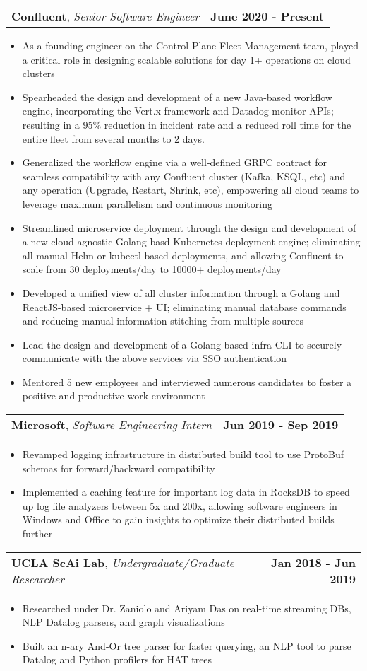 \documentclass[letterpaper,10.8pt]{article}
\makeatletter
\newcommand{\resumeItemOne}[1]{
  \item[$\circ$]\small{{#1 \vspace{-2pt}}
  }
}
\newcommand{\resumeSubheading}[3]{
  \vspace{-2pt}\item[$ $]
    \begin{tabular*}{0.97\textwidth}{l@{\extracolsep{\fill}}r}
      \textbf{#1}, \textit{\small #2} & \textbf{\small #3} \\
    \end{tabular*}
  \vspace{-7pt}
}
\newcommand{\resumeItemListStart}{\begin{itemize}}
\newcommand{\resumeItemListEnd}{\end{itemize}\vspace{-5pt}}
\makeatother
\begin{document}
    \resumeSubheading
    {Confluent}{Senior Software Engineer}{June 2020 - Present}
    \resumeItemListStart
    \resumeItemOne{As a founding engineer on the Control Plane Fleet Management team, played a critical role in designing scalable solutions for day 1+ operations on cloud clusters}
    \resumeItemOne{Spearheaded the design and development of a new Java-based workflow engine, incorporating the Vert.x framework and Datadog monitor APIs; resulting in a 95\% reduction in incident rate and a reduced roll time for the entire fleet from several months to 2 days.}
    \resumeItemOne{Generalized the workflow engine via a well-defined GRPC contract for seamless compatibility with any Confluent cluster (Kafka, KSQL, etc) and any operation (Upgrade, Restart, Shrink, etc), empowering all cloud teams to leverage maximum parallelism and continuous monitoring}
    \resumeItemOne{Streamlined microservice deployment through the design and development of a new cloud-agnostic Golang-basd Kubernetes deployment engine; eliminating all manual Helm or kubectl based deployments, and allowing Confluent to scale from 30 deployments/day to 10000+ deployments/day}
    \resumeItemOne{Developed a unified view of all cluster information through a Golang and ReactJS-based microservice + UI; eliminating manual database commands and reducing manual information stitching from multiple sources}
    \resumeItemOne{Lead the design and development of a Golang-based infra CLI to securely communicate with the above services via SSO authentication}
    \resumeItemOne{Mentored 5 new employees and interviewed numerous candidates to foster a positive and productive work environment}
    \resumeItemListEnd

    \resumeSubheading
    {Microsoft}{Software Engineering Intern}{Jun 2019 - Sep 2019}
    \resumeItemListStart
        \resumeItemOne{Revamped logging infrastructure in distributed build tool to use ProtoBuf schemas for forward/backward compatibility}
        \resumeItemOne{Implemented a caching feature for important log data in RocksDB to speed up log file analyzers between 5x and 200x, allowing software engineers in Windows and Office to gain insights to optimize their distributed builds further}
    \resumeItemListEnd
    
    \resumeSubheading
    {UCLA ScAi Lab}{Undergraduate/Graduate Researcher}{Jan 2018 - Jun 2019}
    \resumeItemListStart
        \resumeItemOne{Researched under Dr. Zaniolo and Ariyam Das on real-time streaming DBs, NLP Datalog parsers, and
        graph visualizations}
        \resumeItemOne{Built an n-ary And-Or tree parser for faster querying, an NLP tool to parse Datalog and Python profilers for HAT trees}
    \resumeItemListEnd
\end{document}

